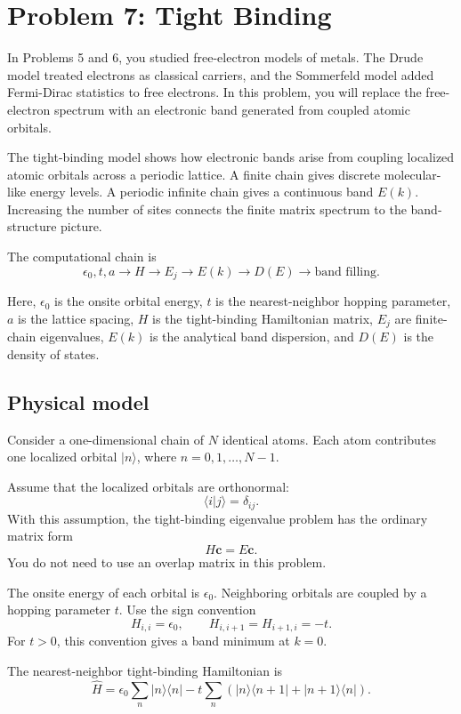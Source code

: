 \section{Problem 7: Tight Binding}

In Problems 5 and 6, you studied free-electron models of metals. The Drude model treated electrons as classical carriers, and the Sommerfeld model added Fermi-Dirac statistics to free electrons. In this problem, you will replace the free-electron spectrum with an electronic band generated from coupled atomic orbitals.

The tight-binding model shows how electronic bands arise from coupling localized atomic orbitals across a periodic lattice. A finite chain gives discrete molecular-like energy levels. A periodic infinite chain gives a continuous band \(E(k)\). Increasing the number of sites connects the finite matrix spectrum to the band-structure picture.

The computational chain is
\[
\epsilon_0,t,a
\longrightarrow
H
\longrightarrow
E_j
\longrightarrow
E(k)
\longrightarrow
D(E)
\longrightarrow
\text{band filling}.
\]

Here, \(\epsilon_0\) is the onsite orbital energy, \(t\) is the nearest-neighbor hopping parameter, \(a\) is the lattice spacing, \(H\) is the tight-binding Hamiltonian matrix, \(E_j\) are finite-chain eigenvalues, \(E(k)\) is the analytical band dispersion, and \(D(E)\) is the density of states.

\subsection{Physical model}

Consider a one-dimensional chain of \(N\) identical atoms. Each atom contributes one localized orbital \(|n\rangle\), where \(n=0,1,\ldots,N-1\).

Assume that the localized orbitals are orthonormal:
\[
\langle i|j\rangle=\delta_{ij}.
\]
With this assumption, the tight-binding eigenvalue problem has the ordinary matrix form
\[
H\mathbf c=E\mathbf c.
\]
You do not need to use an overlap matrix in this problem.

The onsite energy of each orbital is \(\epsilon_0\). Neighboring orbitals are coupled by a hopping parameter \(t\). Use the sign convention
\[
H_{i,i}=\epsilon_0,
\qquad
H_{i,i+1}=H_{i+1,i}=-t.
\]
For \(t>0\), this convention gives a band minimum at \(k=0\).

The nearest-neighbor tight-binding Hamiltonian is
\[
\hat H
=
\epsilon_0\sum_n |n\rangle\langle n|
-
t\sum_n
\left(
|n\rangle\langle n+1|
+
|n+1\rangle\langle n|
\right).
\]

